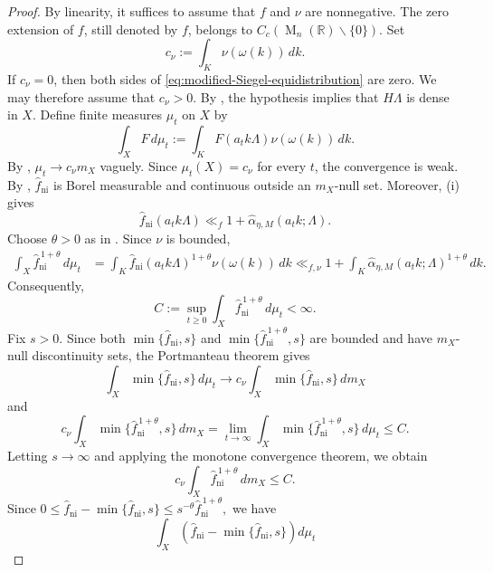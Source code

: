 \documentclass[reqno,11pt]{amsart}
\numberwithin{equation}{section}
\theoremstyle{definition}
\theoremstyle{remark}
\newcommand{\op}{\operatorname}
\newcommand{\R}{\mathbb R}
\newcommand{\M}{\op{M}}
\begin{document}
\begin{proof}
By linearity, it suffices to assume that $f$ and $\nu$ are nonnegative.
The zero extension of $f$, still denoted by $f$, belongs to
$C_c(\M_n(\R)\smallsetminus\{0\})$. Set
$$
c_\nu:=\int_K\nu(\omega(k))\,dk.
$$
If $c_\nu=0$, then both sides of
\eqref{eq:modified-Siegel-equidistribution} are zero. We may therefore
assume that $c_\nu>0$.
By , the hypothesis implies that
$H\Lambda$ is dense in $X$. Define finite measures $\mu_t$ on $X$ by
$$
\int_XF\,d\mu_t
:=
\int_KF(a_tk\Lambda)\nu(\omega(k))\,dk.
$$
By ,
$\mu_t\to c_\nu m_X$ vaguely. Since
$\mu_t(X)=c_\nu$ for every $t$, the convergence is weak.
By ,
$\widehat f_{\operatorname{ni}}$ is Borel measurable and continuous
outside an $m_X$-null set. Moreover,
(i) gives
$$
\widehat f_{\operatorname{ni}}(a_tk\Lambda)
\ll_f
1+\widehat\alpha_{\eta,M}(a_tk;\Lambda).
$$
Choose $\theta>0$ as in
. Since $\nu$ is bounded,
$$
\begin{aligned}
\int_X\widehat f_{\operatorname{ni}}^{\,1+\theta}\,d\mu_t
&=
\int_K
\widehat f_{\operatorname{ni}}(a_tk\Lambda)^{1+\theta}
\nu(\omega(k))\,dk \ll_{f,\nu}
1+\int_K
\widehat\alpha_{\eta,M}(a_tk;\Lambda)^{1+\theta}\,dk.
\end{aligned}
$$
Consequently,
\begin{equation}\label{eq:modified-Siegel-uniform-moment}
C:=
\sup_{t\ge0}
\int_X\widehat f_{\operatorname{ni}}^{\,1+\theta}\,d\mu_t
<\infty.
\end{equation}
Fix $s>0$. Since both
$
\min\{\widehat f_{\operatorname{ni}},s\}$ and $
\min\{\widehat f_{\operatorname{ni}}^{\,1+\theta},s\}$
are bounded and have $m_X$-null discontinuity sets, the Portmanteau
theorem gives
$$
\int_X\min\{\widehat f_{\operatorname{ni}},s\}\,d\mu_t
\to 
c_\nu\int_X\min\{\widehat f_{\operatorname{ni}},s\}\,dm_X
$$
and
$$
c_\nu\int_X
\min\{\widehat f_{\operatorname{ni}}^{\,1+\theta},s\}\,dm_X
=
\lim_{t\to\infty}\int_X
\min\{\widehat f_{\operatorname{ni}}^{\,1+\theta},s\}\,d\mu_t
\le C.
$$
Letting $s\to\infty$ and applying the monotone convergence theorem, we
obtain
$$
c_\nu
\int_X\widehat f_{\operatorname{ni}}^{\,1+\theta}\,dm_X
\le C.
$$
Since
$
0\le
\widehat f_{\operatorname{ni}}
-\min\{\widehat f_{\operatorname{ni}},s\}
\le
s^{-\theta}\widehat f_{\operatorname{ni}}^{\,1+\theta},
$
we have
$$
\int_X
\left(
\widehat f_{\operatorname{ni}}
-\min\{\widehat f_{\operatorname{ni}},s\}
\right)d\mu_t
$$
\end{proof}
\end{document}

